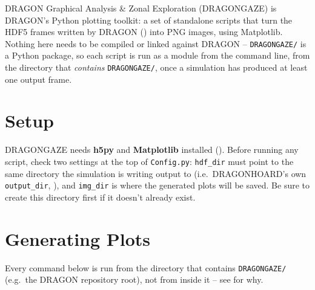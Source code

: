 \documentclass[11pt]{report}
\newcommand{\bash}[1]{\lstinline[language=bash]{#1}}
\newcommand{\py}[1]{\lstinline[language=Python]{#1}}
\begin{document}
DRAGON Graphical Analysis \& Zonal Exploration (DRAGONGAZE) is DRAGON's Python plotting toolkit: a set of standalone scripts that turn the HDF5 frames written by DRAGON () into PNG images, using Matplotlib. Nothing here needs to be compiled or linked against DRAGON -- \bash{DRAGONGAZE/} is a Python package, so each script is run as a module from the command line, from the directory that \emph{contains} \bash{DRAGONGAZE/}, once a simulation has produced at least one output frame.

\section{Setup}
\label{sec:gaze-setup}

DRAGONGAZE needs \textbf{h5py} and \textbf{Matplotlib} installed (). Before running any script, check two settings at the top of \py{Config.py}: \py{hdf_dir} must point to the same directory the simulation is writing output to (i.e.\ DRAGONHOARD's own \py{output_dir}, ), and \py{img_dir} is where the generated plots will be saved. Be sure to create this directory first if it doesn't already exist.

\section{Generating Plots}
\label{sec:gaze-usage}

Every command below is run from the directory that contains \bash{DRAGONGAZE/} (e.g.\ the DRAGON repository root), not from inside it -- see  for why.
\end{document}
